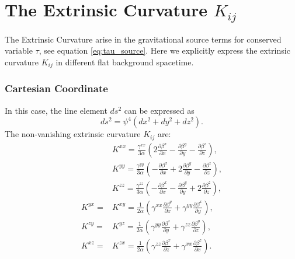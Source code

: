 \section{The Extrinsic Curvature $K_{ij}$}
The Extrinsic Curvature arise in the gravitational source terms for conserved variable $\tau$, see equation \eqref{eq:tau_source}.
Here we explicitly express the extrinsic curvature $K_{ij}$ in different flat background spacetime.

\subsubsection*{Cartesian Coordinate}
In this case, the line element $ds^2$ can be expressed as
\begin{equation}
 ds^2 = \psi^4 ( dx^2 + dy^2 + dz^2 ).
\end{equation}
The non-vanishing extrinsic curvature $K_{ij}$ are:
\begin{align}
	&K^{xx} = \frac{\gamma^{xx}}{3 \alpha} \left( 2 \frac{\partial \beta^x}{\partial x} - \frac{\partial \beta^y}{\partial y} - \frac{\partial \beta^z}{\partial z} \right)  ,\\
	&K^{yy} = \frac{\gamma^{yy}}{3 \alpha} \left( - \frac{\partial \beta^x}{\partial x} + 2 \frac{\partial \beta^y}{\partial y} - \frac{\partial \beta^z}{\partial z} \right)  ,\\
	&K^{zz} = \frac{\gamma^{zz}}{3 \alpha} \left( - \frac{\partial \beta^x}{\partial x} - \frac{\partial \beta^y}{\partial y} + 2 \frac{\partial \beta^z}{\partial z} \right) , \\
	K^{yx} = &K^{xy} = \frac{1}{2 \alpha} \left( \gamma^{xx} \frac{\partial  \beta^y}{\partial x} + \gamma^{yy} \frac{\partial  \beta^x}{\partial y} \right) ,\\
	K^{zy} = &K^{yz} = \frac{1}{2 \alpha} \left( \gamma^{yy} \frac{\partial  \beta^z}{\partial y} + \gamma^{zz} \frac{\partial  \beta^y}{\partial z} \right) ,\\
	K^{xz} = &K^{zx} = \frac{1}{2 \alpha} \left( \gamma^{zz} \frac{\partial  \beta^x}{\partial z} + \gamma^{xx} \frac{\partial  \beta^z}{\partial x} \right) .
\end{align}

